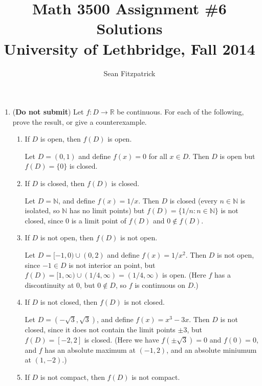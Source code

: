 \documentclass[letterpaper,12pt]{article}
\title{Math 3500 Assignment \#6 Solutions\\University of Lethbridge, Fall 2014}
\author{Sean Fitzpatrick}
\newcommand{\R}{\mathbb{R}}
\newcommand{\N}{\mathbb{N}}
\begin{document}
 \maketitle


\begin{enumerate}
 \item ({\bf Do not submit}) Let $f:D\to\R$ be continuous. For each of the following, prove the result, or give a counterexample.
\begin{enumerate}
 \item If $D$ is open, then $f(D)$ is open.

\bigskip

Let $D=(0,1)$ and define $f(x)=0$ for all $x\in D$. Then $D$ is open but $f(D)=\{0\}$ is closed.

\bigskip

 \item If $D$ is closed, then $f(D)$ is closed.

\bigskip

Let $D=\N$, and define $f(x)=1/x$. Then $D$ is closed (every $n\in\N$ is isolated, so $\N$ has no limit points) but $f(D) = \{1/n:n\in\N\}$ is not closed, since $0$ is a limit point of $f(D)$ and $0\notin f(D)$.

\bigskip

 \item If $D$ is not open, then $f(D)$ is not open.

\bigskip

Let $D=[-1,0)\cup (0,2)$ and define $f(x)=1/x^2$. Then $D$ is not open, since $- 1\in D$ is not interior an point, but $f(D) = [1,\infty)\cup (1/4,\infty) = (1/4,\infty)$ is open. (Here $f$ has a discontinuity at 0, but $0\notin D$, so $f$ is continuous on $D$.)

\bigskip

 \item If $D$ is not closed, then $f(D)$ is not closed.

\bigskip

Let $D=(-\sqrt{3},\sqrt{3})$, and define $f(x)=x^3-3x$. Then $D$ is not closed, since it does not contain the limit points $\pm 3$, but $f(D) = [-2,2]$ is closed. (Here we have $f(\pm\sqrt{3})=0$ and $f(0)=0$, and $f$ has an absolute maximum at $(-1,2)$, and an absolute miniumum at $(1,-2)$.)

\bigskip

 \item If $D$ is not compact, then $f(D)$ is not compact.

\bigskip


\end{enumerate}
\end{enumerate}
\end{document}
